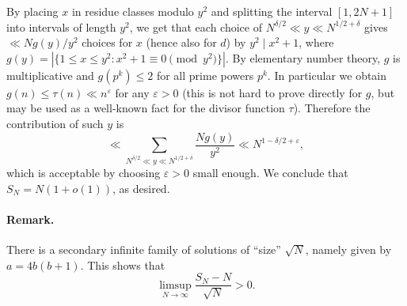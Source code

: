 \documentclass{article}
\begin{document}
By placing $x$ in residue classes modulo $y^2$ and splitting the interval $[1, 2N+1]$ into intervals of length $y^2$, we get that each choice of $N^{\delta/2} \ll y \ll N^{1/2+\delta}$ gives $\ll N g(y)/y^2$ choices for $x$ (hence also for $d$) by $y^2 \mid x^2 + 1$, where $g(y) = |\{1 \leq x \leq y^2 : x^2 + 1 \equiv 0 \pmod{y^2}\}|$. By elementary number theory, $g$ is multiplicative and $g(p^k) \leq 2$ for all prime powers $p^k$. In particular we obtain $g(n) \leq \tau(n) \ll n^{\varepsilon}$ for any $\varepsilon > 0$ (this is not hard to prove directly for $g$, but may be used as a well-known fact for the divisor function $\tau$). Therefore the contribution of such $y$ is
\[
\ll \sum_{N^{\delta/2} \ll y \ll N^{1/2+\delta}} \frac{N g(y)}{y^2} \ll N^{1-\delta/2+\varepsilon},
\]
which is acceptable by choosing $\varepsilon > 0$ small enough. We conclude that $S_N = N(1 + o(1))$, as desired.

\paragraph{Remark.}
There is a secondary infinite family of solutions of ``size'' $\sqrt{N}$, namely given by $a = 4b(b+1)$. This shows that
\[
\limsup_{N \to \infty} \frac{S_N - N}{\sqrt{N}} > 0.
\]
\end{document}
